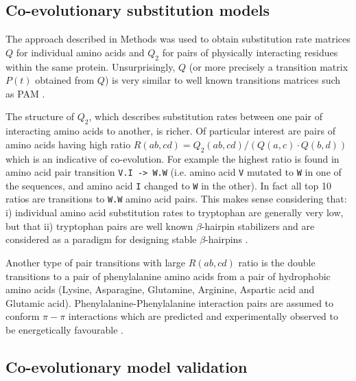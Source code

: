 \subsection{Co-evolutionary substitution models}

The approach described in Methods was used to obtain substitution rate matrices $Q$ for individual amino acids and $Q_2$ for pairs of physically interacting residues within the same protein. 
Unsurprisingly, $Q$ (or more precisely a transition matrix $P(t)$ obtained from $Q$) is very similar to well known transitions matrices such as PAM \cite{dayhoff1978model}. 

The structure of $Q_2$, which describes substitution rates between one pair of interacting amino acids to another, is richer.
Of particular interest are pairs of amino acids having high ratio $R(ab,cd) = Q_2 (ab, cd) / ( Q(a,c) \cdot Q(b,d) )$ which is an indicative of co-evolution.
For example the highest ratio is found in amino acid pair transition \texttt{V.I -> W.W} (i.e. amino acid \texttt{V} mutated to \texttt{W} in one of the sequences, and amino acid \texttt{I} changed to \texttt{W} in the other). 
In fact all top 10 ratios are transitions to \texttt{W.W} amino acid pairs.
This makes sense considering that:
i) individual amino acid substitution rates to tryptophan are generally very low, but that 
ii) tryptophan pairs are well known $\beta$-hairpin stabilizers and are considered as a paradigm for designing stable $\beta$-hairpins \cite{santiveri2010tryptophan}.

Another type of pair transitions with large $R(ab,cd)$ ratio is the double transitions to a pair of phenylalanine amino acids from a pair of hydrophobic amino acids (Lysine, Asparagine, Glutamine, Arginine, Aspartic acid and Glutamic acid). 
Phenylalanine-Phenylalanine interaction pairs are assumed to conform $\pi-\pi$ interactions which are predicted and experimentally observed to be energetically favourable \cite{hunter1991pi}.

\subsection{Co-evolutionary model validation}

